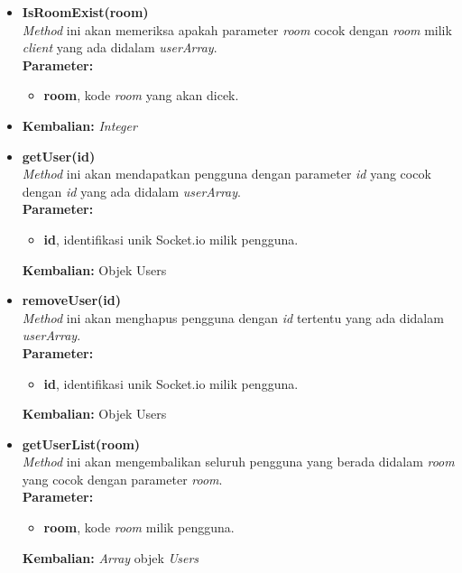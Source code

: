 \begin{enumerate}
\begin{enumerate}
\begin{itemize}
\begin{itemize}
				\item \textbf{IsRoomExist(room)} \\
				\textit{Method} ini akan memeriksa apakah parameter \textit{room} cocok dengan \textit{room} milik \textit{client} yang ada didalam \textit{userArray}. \\
				\textbf{Parameter:}
				\begin{itemize}
					\item \textbf{room}, kode \textit{room} yang akan dicek.
				\end{itemize}
				\item \textbf{Kembalian:} \textit{Integer}
				
				\item \textbf{getUser(id)} \\
				\textit{Method} ini akan mendapatkan pengguna dengan parameter \textit{id} yang cocok dengan \textit{id} yang ada didalam \textit{userArray}. \\
				\textbf{Parameter:}
				\begin{itemize}
					\item \textbf{id}, identifikasi unik Socket.io milik pengguna.
				\end{itemize}
				\textbf{Kembalian:} Objek Users
				
				\item \textbf{removeUser(id)} \\ 
				\textit{Method} ini akan menghapus pengguna dengan \textit{id} tertentu yang ada didalam \textit{userArray}. \\
				\textbf{Parameter:}
				\begin{itemize}
					\item \textbf{id}, identifikasi unik Socket.io milik pengguna.
				\end{itemize}
				\textbf{Kembalian:} Objek Users
				
				\item \textbf{getUserList(room)} \\
				\textit{Method} ini akan mengembalikan seluruh pengguna yang berada didalam \textit{room} yang cocok dengan parameter \textit{room}. \\
				\textbf{Parameter:}
				\begin{itemize}
					\item \textbf{room}, kode \textit{room} milik pengguna.
				\end{itemize}
				\textbf{Kembalian:} \textit{Array} objek \textit{Users}
			\end{itemize}
			

\end{itemize}
\end{enumerate}
\end{enumerate}
